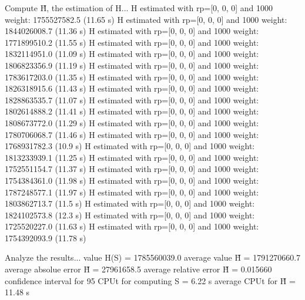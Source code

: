 Compute H̃, the estimation of H...
  H estimated with rp=[0, 0, 0] and 1000 weight:  1755527582.5  (11.65 s)
  H estimated with rp=[0, 0, 0] and 1000 weight:  1844026008.7  (11.36 s)
  H estimated with rp=[0, 0, 0] and 1000 weight:  1771899510.2  (11.55 s)
  H estimated with rp=[0, 0, 0] and 1000 weight:  1832114951.0  (11.09 s)
  H estimated with rp=[0, 0, 0] and 1000 weight:  1806823356.9  (11.19 s)
  H estimated with rp=[0, 0, 0] and 1000 weight:  1783617203.0  (11.35 s)
  H estimated with rp=[0, 0, 0] and 1000 weight:  1826318915.6  (11.43 s)
  H estimated with rp=[0, 0, 0] and 1000 weight:  1828863535.7  (11.07 s)
  H estimated with rp=[0, 0, 0] and 1000 weight:  1802614888.2  (11.41 s)
  H estimated with rp=[0, 0, 0] and 1000 weight:  1808673772.0  (11.29 s)
  H estimated with rp=[0, 0, 0] and 1000 weight:  1780706068.7  (11.46 s)
  H estimated with rp=[0, 0, 0] and 1000 weight:  1768931782.3  (10.9 s)
  H estimated with rp=[0, 0, 0] and 1000 weight:  1813233939.1  (11.25 s)
  H estimated with rp=[0, 0, 0] and 1000 weight:  1752551154.7  (11.37 s)
  H estimated with rp=[0, 0, 0] and 1000 weight:  1754384361.0  (11.98 s)
  H estimated with rp=[0, 0, 0] and 1000 weight:  1787248577.1  (11.97 s)
  H estimated with rp=[0, 0, 0] and 1000 weight:  1803862713.7  (11.5 s)
  H estimated with rp=[0, 0, 0] and 1000 weight:  1824102573.8  (12.3 s)
  H estimated with rp=[0, 0, 0] and 1000 weight:  1725520227.0  (11.63 s)
  H estimated with rp=[0, 0, 0] and 1000 weight:  1754392093.9  (11.78 s)

Analyze the results...
  value H(S)                  = 1785560039.0 
  average value H̃             = 1791270660.7 
  average absolue error H̃     = 27961658.5 
  average relative error H̃    = 0.015660 
  confidence interval for 95%
  CPUt for computing S         = 6.22 s
  average CPUt for H̃           = 11.48 s

